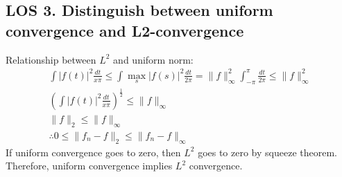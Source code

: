 \documentclass[12pt, a4paper]{article}
\begin{document}
\subsection*{LOS 3. Distinguish between uniform convergence and L2-convergence}
Relationship between $L^2$ and uniform norm:
\begin{gather*}
    \int |f(t)|^2 \frac{dt}{x\pi} \leq \int \max_s |f(s)|^2\frac{dt}{2\pi} = \|f\|^2_\infty \int_{-\pi}^\pi \frac{dt}{2\pi} \leq \|f\|^2_\infty \\
    \left(\int |f(t)|^2 \frac{dt}{x\pi}\right)^\frac{1}{2}\leq \|f\|_\infty \\
    \|f\|_2 \leq \|f\|_\infty\\
    \therefore 0 \leq \|f_n-f\|_2 \leq \|f_n-f\|_\infty
\end{gather*}
If uniform convergence goes to zero, then $L^2$ goes to zero by squeeze theorem. Therefore, uniform convergence implies $L^2$ convergence. \\
\vspace{0.3em}
\end{document}
